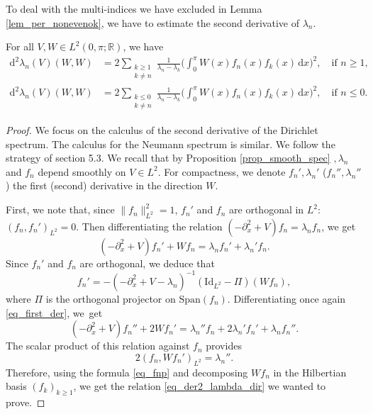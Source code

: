 To deal with the multi-indices we have excluded in Lemma \ref{lem_per_nonevenok}, we have to estimate the second derivative of $\lambda_n$.
\begin{lemma}
\label{lem_der2_lamb_abs}For all $V,W\in L^2(0,\pi;\mathbb{R})$, we have
\begin{align}
\label{eq_der2_lambda_dir}
\mathrm{d}^2\lambda_n(V)(W,W) &= 2\sum_{\substack{k \geq 1\\ k\neq n}} \frac1{\lambda_n - \lambda_k} \biggl(\int_0^\pi W(x) f_n(x) f_k(x) \, \mathrm{d}x \biggr)^2, \quad \text{if } n\geq 1,
\\
\label{eq_der2_lambda_neu}
\mathrm{d}^2\lambda_n(V)(W,W) &= 2\sum_{\substack{k \leq 0\\ k\neq n}} \frac1{\lambda_n - \lambda_k} \biggl(\int_0^\pi W(x) f_n(x) f_k(x) \, \mathrm{d}x \biggr)^2, \quad \text{if } n\leq 0.
\end{align}
\end{lemma}
\begin{proof}
We focus on the calculus of the second derivative of the Dirichlet spectrum. The calculus for the Neumann spectrum is similar. We follow the strategy of \cite{BG06} section 5.3. We recall that by Proposition \ref{prop_smooth_spec} $,\lambda_n$ and $f_n$ depend smoothly on $V\in L^2$. For compactness, we denote $f_n',\lambda_n'$ (\resp $f_n'',\lambda_n''$) the first (\resp second) derivative in the direction $W$.

First, we note that, since $\|f_n\|_{L^2}^2 \!=\! 1$, $f_n'$ and $f_n$ are orthogonal in $L^2$: $(f_n,f_n')_{L^2}\!=\!0$. Then differentiating the relation $(-\partial_x^2 +V)f_n = \lambda_n f_n $, we get
\begin{equation}
\label{eq_first_der}
(-\partial_x^2 +V)f_n' + W f_n= \lambda_n f_n' + \lambda_n' f_n.
\end{equation}
Since $f_n'$ and $f_n$ are orthogonal, we deduce that
\begin{equation}
\label{eq_fnp}
f_n'= -(-\partial_x^2 +V - \lambda_n)^{-1} (\mathrm{Id}_{L^2} - \Pi)(W f_n),
\end{equation}
where $\Pi$ is the orthogonal projector on $\mathrm{Span}(f_n)$. Differentiating once again \eqref{eq_first_der}, we~get
\[
(-\partial_x^2 +V)f_n'' +2 W f_n'=\lambda_n'' f_n + 2\lambda_n' f_n' +\lambda_n f_n''.
\]
The scalar product of this relation against $f_n$ provides
\[
2 (f_n,W f_n')_{L^2} = \lambda_n''.
\]
Therefore, using the formula \eqref{eq_fnp} and decomposing $W f_n$ in the Hilbertian basis $(f_k)_{k\geq 1}$, we get the relation \eqref{eq_der2_lambda_dir} we wanted to prove.
\end{proof}


